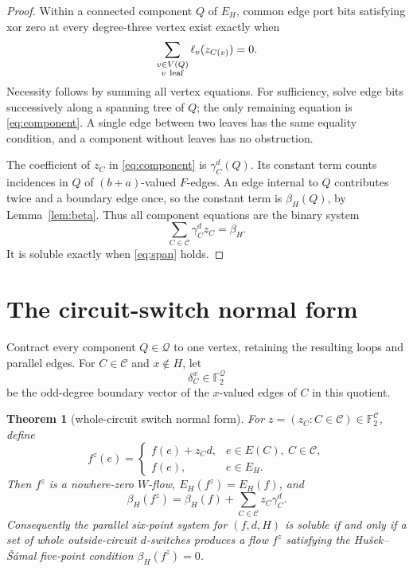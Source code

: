 \documentclass[11pt]{article}
\newtheorem{theorem}{Theorem}[section]
\theoremstyle{definition}
\theoremstyle{remark}
\newcommand{\F}{\mathbb F}
\newcommand{\Q}{\mathcal Q}
\newcommand{\C}{\mathcal C}
\numberwithin{equation}{section}
\begin{document}
\begin{proof}
Within a connected component \(Q\) of \(E_H\), common edge port bits
satisfying xor zero at every degree-three vertex exist exactly when
\begin{equation}
                  \sum_{\substack{v\in V(Q)\\v\ {\rm leaf}}}
                  \ell_v(z_{C(v)})=0.                        \label{eq:component}
\end{equation}
Necessity follows by summing all vertex equations.  For sufficiency,
solve edge bits successively along a spanning tree of \(Q\); the only
remaining equation is \eqref{eq:component}.  A single edge between two
leaves has the same equality condition, and a component without leaves
has no obstruction.

The coefficient of \(z_C\) in \eqref{eq:component} is
\(\gamma_C^d(Q)\).  Its constant term counts incidences in \(Q\) of
\((b+a)\)-valued \(F\)-edges.  An edge internal to \(Q\) contributes
twice and a boundary edge once, so the constant term is
\(\beta_H(Q)\), by Lemma~\ref{lem:beta}.  Thus all component equations
are the binary system
\[
                    \sum_{C\in\C}\gamma_C^d z_C=\beta_H.
\]
It is soluble exactly when \eqref{eq:span} holds.
\end{proof}

\section{The circuit-switch normal form}

Contract every component \(Q\in\Q\) to one vertex, retaining the
resulting loops and parallel edges.  For \(C\in\C\) and \(x\notin H\),
let
\[
                   \delta_C^x\in\F_2^{\Q}
\]
be the odd-degree boundary vector of the \(x\)-valued edges of \(C\) in
this quotient.

\begin{theorem}[whole-circuit switch normal form]\label{thm:switch}
For \(z=(z_C:C\in\C)\in\F_2^\C\), define
\begin{equation}
 f^z(e)=
 \begin{cases}
 f(e)+z_Cd,&e\in E(C),\ C\in\C,\\
 f(e),&e\in E_H.
 \end{cases}                                                 \label{eq:switch}
\end{equation}
Then \(f^z\) is a nowhere-zero \(W\)-flow,
\(E_H(f^z)=E_H(f)\), and
\begin{equation}
             \beta_H(f^z)=
             \beta_H(f)+\sum_{C\in\C}z_C\gamma_C^d.          \label{eq:betaswitch}
\end{equation}
Consequently the parallel six-point system for \((f,d,H)\) is soluble
if and only if a set of whole outside-circuit \(d\)-switches produces a
flow \(f^z\) satisfying the Hu\v{s}ek--\v{S}\'amal five-point condition
\(\beta_H(f^z)=0\).
\end{theorem}
\end{document}

